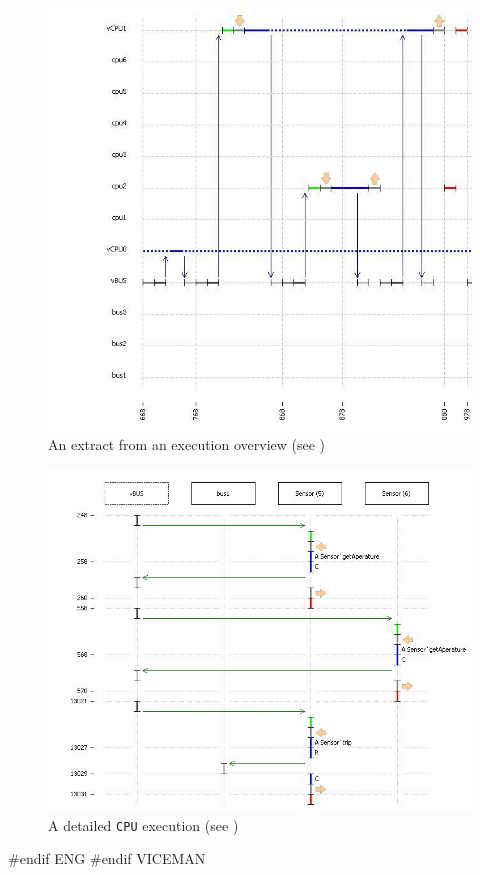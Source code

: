 \documentclass[\pformat,12pt]{article}
\begin{document}
\begin{figure}
\begin{center}
\includegraphics[width=\textwidth]{exeoverview.png}
\end{center}
\caption{An extract from an execution overview (see \cite{VICEGuide-SCSK})}
\label{fig:exeoverview}
\end{figure}

\begin{figure}
\begin{center}
\includegraphics[width=\textwidth]{detailedexe.png}
\end{center}
\caption{A detailed \texttt{CPU} execution (see \cite{VICEGuide-SCSK})}
\label{fig:detailedexe}
\end{figure}
#endif ENG
#endif VICEMAN
\end{document}
